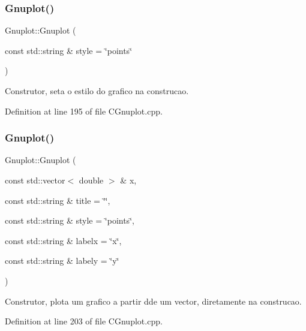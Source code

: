 \subsubsection{\texorpdfstring{Gnuplot()}{Gnuplot()}\hspace{0.1cm}{\footnotesize\ttfamily [1/4]}}
{\footnotesize\ttfamily Gnuplot\+::\+Gnuplot (\begin{DoxyParamCaption}\item[{const std\+::string \&}]{style = {\ttfamily \char`\"{}points\char`\"{}} }\end{DoxyParamCaption})}



Construtor, seta o estilo do grafico na construcao. 



Definition at line 195 of file C\+Gnuplot.\+cpp.

\mbox{\label{class_gnuplot_a8ceac5808e42665c1dee305ae7ea9070}} 
\subsubsection{\texorpdfstring{Gnuplot()}{Gnuplot()}\hspace{0.1cm}{\footnotesize\ttfamily [2/4]}}
{\footnotesize\ttfamily Gnuplot\+::\+Gnuplot (\begin{DoxyParamCaption}\item[{const std\+::vector$<$ double $>$ \&}]{x,  }\item[{const std\+::string \&}]{title = {\ttfamily \char`\"{}\char`\"{}},  }\item[{const std\+::string \&}]{style = {\ttfamily \char`\"{}points\char`\"{}},  }\item[{const std\+::string \&}]{labelx = {\ttfamily \char`\"{}x\char`\"{}},  }\item[{const std\+::string \&}]{labely = {\ttfamily \char`\"{}y\char`\"{}} }\end{DoxyParamCaption})}



Construtor, plota um grafico a partir dde um vector, diretamente na construcao. 



Definition at line 203 of file C\+Gnuplot.\+cpp.

\mbox{\label{class_gnuplot_a24327b6116c71acdc195eadf665c67cb}} 
